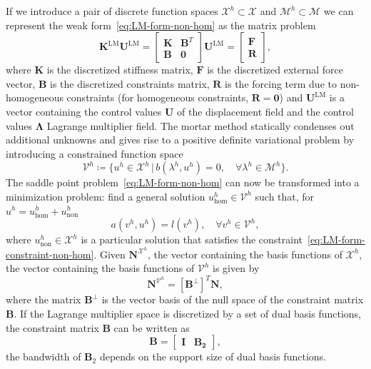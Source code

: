 If we introduce a pair of discrete function spaces $\mathcal{X}^h \subset \mathcal{X}$ and $\mathcal{M}^h \subset \mathcal{M}$ we can represent the weak form~\eqref{eq:LM-form-non-hom} as the matrix problem
\begin{equation}\label{eq:disc-LM-form-non-hom}
	\mathbf{K}^\text{LM}\mathbf{U}^{\text{LM}}=\begin{bmatrix}
		\mathbf{K} & \mathbf{B}^T \\
		\mathbf{B} & \mathbf{0}
	\end{bmatrix}\mathbf{U}^{\text{LM}}
	=
	\begin{bmatrix}
		\mathbf{F} \\
		\mathbf{R}
	\end{bmatrix},
\end{equation}
where $\mathbf{K}$ is the discretized stiffness matrix, $\mathbf{F}$ is the discretized external force vector, $\mathbf{B}$ is the discretized constraints matrix, $\mathbf{R}$ is the forcing term due to non-homogeneous constraints (for homogeneous constraints, $\mathbf{R} = \mathbf{0}$) and $\mathbf{U}^{\text{LM}}$ is a vector containing the control values $\mathbf{U}$ of the displacement field and the control values $\mathbf{\Lambda}$ Lagrange multiplier field. The mortar method statically condenses out additional unknowns and gives rise to a positive definite variational problem by introducing a constrained function space
\begin{equation}
	\mathcal{V}^h\coloneq\{u^h\in\mathcal{X}^h\, | \, b(\lambda^h,u^h)=0, \quad \forall{}\lambda^h\in\mathcal{M}^h\}.
\end{equation}
The saddle point problem~\eqref{eq:LM-form-non-hom} can now be transformed into a minimization problem: find a general solution $u^h_\text{hom}\in\mathcal{V}^h$ such that, for $u^h = u^h_\text{hom}+ u^h_\text{non}$
\begin{equation}
	a(v^h, u^h)=l(v^h),\quad \forall{}v^h\in\mathcal{V}^h,
\end{equation}
where $u^h_\text{non}\in \mathcal{X}^h$ is a particular solution that satisfies the constraint~\eqref{eq:LM-form-constraint-non-hom}. Given $\mathbf{N}^{\mathcal{X}^h}$, the vector containing the basis functions of $\mathcal{X}^h$, the vector containing the basis functions of $\mathcal{V}^h$ is given by
\begin{equation}
	\mathbf{N}^{\mathcal{V}^h}=\left[\mathbf{B}^\perp\right]^T\mathbf{N},\label{eq:basis-null-space-non-hom}
\end{equation}
where the matrix $\mathbf{B}^\perp$ is the vector basis of the null space of the constraint matrix $\mathbf{B}$. If the Lagrange multiplier space is discretized by a set of dual basis functions, the constraint matrix $\mathbf{B}$ can be written as~\cite{gilbert1987computing}
\begin{equation}\label{eq:constraint-form-non-hom}
	\mathbf{B}=\begin{bmatrix}
		\mathbf{I} & \mathbf{B_2}
	\end{bmatrix},
\end{equation}
the bandwidth of $\mathbf{B}_2$ depends on the support size of dual basis functions. \par

